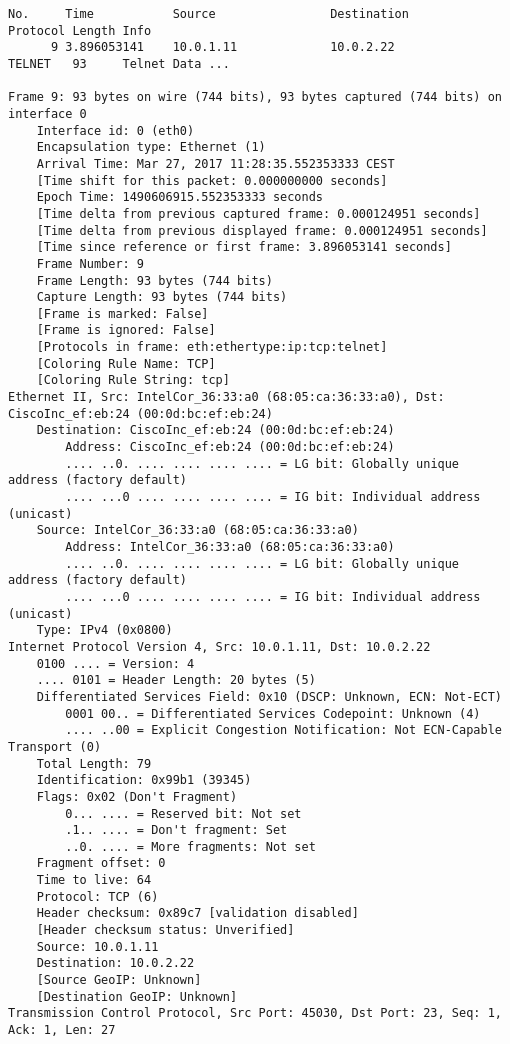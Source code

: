 \begin{verbatim}
No.     Time           Source                Destination           Protocol Length Info
      9 3.896053141    10.0.1.11             10.0.2.22             TELNET   93     Telnet Data ...

Frame 9: 93 bytes on wire (744 bits), 93 bytes captured (744 bits) on interface 0
    Interface id: 0 (eth0)
    Encapsulation type: Ethernet (1)
    Arrival Time: Mar 27, 2017 11:28:35.552353333 CEST
    [Time shift for this packet: 0.000000000 seconds]
    Epoch Time: 1490606915.552353333 seconds
    [Time delta from previous captured frame: 0.000124951 seconds]
    [Time delta from previous displayed frame: 0.000124951 seconds]
    [Time since reference or first frame: 3.896053141 seconds]
    Frame Number: 9
    Frame Length: 93 bytes (744 bits)
    Capture Length: 93 bytes (744 bits)
    [Frame is marked: False]
    [Frame is ignored: False]
    [Protocols in frame: eth:ethertype:ip:tcp:telnet]
    [Coloring Rule Name: TCP]
    [Coloring Rule String: tcp]
Ethernet II, Src: IntelCor_36:33:a0 (68:05:ca:36:33:a0), Dst: CiscoInc_ef:eb:24 (00:0d:bc:ef:eb:24)
    Destination: CiscoInc_ef:eb:24 (00:0d:bc:ef:eb:24)
        Address: CiscoInc_ef:eb:24 (00:0d:bc:ef:eb:24)
        .... ..0. .... .... .... .... = LG bit: Globally unique address (factory default)
        .... ...0 .... .... .... .... = IG bit: Individual address (unicast)
    Source: IntelCor_36:33:a0 (68:05:ca:36:33:a0)
        Address: IntelCor_36:33:a0 (68:05:ca:36:33:a0)
        .... ..0. .... .... .... .... = LG bit: Globally unique address (factory default)
        .... ...0 .... .... .... .... = IG bit: Individual address (unicast)
    Type: IPv4 (0x0800)
Internet Protocol Version 4, Src: 10.0.1.11, Dst: 10.0.2.22
    0100 .... = Version: 4
    .... 0101 = Header Length: 20 bytes (5)
    Differentiated Services Field: 0x10 (DSCP: Unknown, ECN: Not-ECT)
        0001 00.. = Differentiated Services Codepoint: Unknown (4)
        .... ..00 = Explicit Congestion Notification: Not ECN-Capable Transport (0)
    Total Length: 79
    Identification: 0x99b1 (39345)
    Flags: 0x02 (Don't Fragment)
        0... .... = Reserved bit: Not set
        .1.. .... = Don't fragment: Set
        ..0. .... = More fragments: Not set
    Fragment offset: 0
    Time to live: 64
    Protocol: TCP (6)
    Header checksum: 0x89c7 [validation disabled]
    [Header checksum status: Unverified]
    Source: 10.0.1.11
    Destination: 10.0.2.22
    [Source GeoIP: Unknown]
    [Destination GeoIP: Unknown]
Transmission Control Protocol, Src Port: 45030, Dst Port: 23, Seq: 1, Ack: 1, Len: 27

\end{verbatim}
